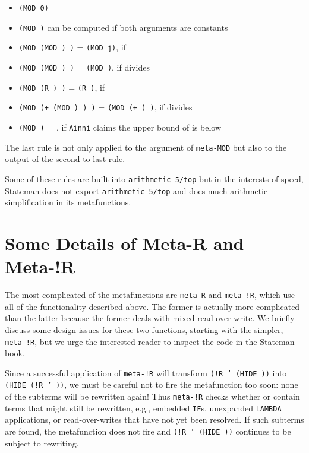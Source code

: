 \documentclass[submission,copyright,creativecommons]{eptcs}
\newcommand{\ptt}[1]{\tt{#1}}
\begin{document}
\begin{itemize}
\item {\ptt{(MOD  0)}} = 

\item {\ptt{(MOD  )}} can be computed if both arguments are constants

\item {\ptt{(MOD (MOD  ) )}} = {\ptt{(MOD  j)}}, if 
\item {\ptt{(MOD (MOD  ) )}} = {\ptt{(MOD  )}}, if  divides 
\item {\ptt{(MOD (R   ) )}} = {\ptt{(R   )}}, if 
\item {\ptt{(MOD (+   (MOD  )  ) )}} = {\ptt{(MOD (+     ) )}}, if  divides 
\item {\ptt{(MOD  )}} = , if {\ptt{Ainni}} claims the upper bound of  is below 
\end{itemize}

The last rule is not only applied to the argument of {\ptt{meta-MOD}} but
also to the output of the second-to-last rule.

Some of these rules are built into {\ptt{arithmetic-5/top}} but in the
interests of speed, Stateman does not export {\ptt{arithmetic-5/top}} and
does much arithmetic simplification in its metafunctions.

\section{Some Details of Meta-R and Meta-!R}

The most complicated of the metafunctions are {\ptt{meta-R}} and
{\ptt{meta-!R}}, which use all of the functionality described above.  The
former is actually more complicated than the latter because the former deals
with mixed read-over-write.  We briefly discuss some design issues for these
two functions, starting with the simpler, {\ptt{meta-!R}}, but we urge the
interested reader to inspect the code in the Stateman book.

Since a successful application of {\ptt{meta-!R}} will transform {\ptt{(!R
     '  (HIDE ))}} into {\ptt{(HIDE (!R  '  ))}}, we
must be careful not to fire the metafunction too soon: none of the subterms
will be rewritten again!  Thus {\ptt{meta-!R}} checks whether  or  contain
terms that might still be rewritten, e.g., embedded {\ptt{IF}}s, unexpanded
{\ptt{LAMBDA}} applications, or read-over-writes that have not yet been
resolved.  If such subterms are found, the metafunction does not fire and
{\ptt{(!R  '  (HIDE ))}} continues to be subject to rewriting.
\end{document}
